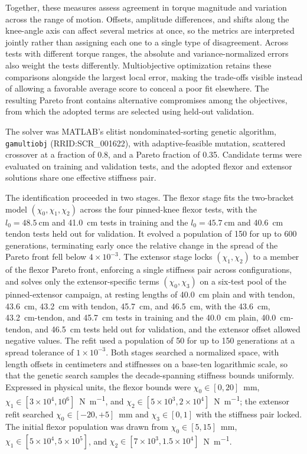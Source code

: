 \documentclass[utf8]{FrontiersinHarvard} %
\begin{document}
Together, these measures assess agreement in torque magnitude and variation across the range of motion. Offsets, amplitude differences, and shifts along the knee-angle axis can affect several metrics at once, so the metrics are interpreted jointly rather than assigning each one to a single type of disagreement. Across tests with different torque ranges, the absolute and variance-normalized errors also weight the tests differently. Multiobjective optimization retains these comparisons alongside the largest local error, making the trade-offs visible instead of allowing a favorable average score to conceal a poor fit elsewhere. The resulting Pareto front contains alternative compromises among the objectives, from which the adopted terms are selected using held-out validation.

The solver was MATLAB's elitist nondominated-sorting genetic algorithm, \texttt{gamultiobj} (RRID:SCR\_001622), with adaptive-feasible mutation, scattered crossover at a fraction of 0.8, and a Pareto fraction of 0.35. Candidate terms were evaluated on training and validation tests, and the adopted flexor and extensor solutions share one effective stiffness pair.

The identification proceeded in two stages. The flexor stage fits the two-bracket model $(\chi_{0}, \chi_{1}, \chi_{2})$ across the four pinned-knee flexor tests, with the $l_{0}=\qty{48.5}{\cm}$ and \qty{41.0}{\cm} tests in training and the $l_{0}=\qty{45.7}{\cm}$ and \qty{40.6}{\cm} tendon tests held out for validation. It evolved a population of 150 for up to 600 generations, terminating early once the relative change in the spread of the Pareto front fell below $4\times10^{-3}$. The extensor stage locks $(\chi_{1}, \chi_{2})$ to a member of the flexor Pareto front, enforcing a single stiffness pair across configurations, and solves only the extensor-specific terms $(\chi_{0}, \chi_{3})$ on a six-test pool of the pinned-extensor campaign, at resting lengths of \qty{40.0}{\cm} plain and with tendon, \qty{43.6}{\cm}, \qty{43.2}{\cm} with tendon, \qty{45.7}{\cm}, and \qty{46.5}{\cm}, with the \qty{43.6}{\cm}, \qty{43.2}{\cm}-tendon, and \qty{45.7}{\cm} tests in training and the \qty{40.0}{\cm} plain, \qty{40.0}{\cm}-tendon, and \qty{46.5}{\cm} tests held out for validation, and the extensor offset allowed negative values. The refit used a population of 50 for up to 150 generations at a spread tolerance of $1\times10^{-3}$. Both stages searched a normalized space, with length offsets in centimeters and stiffnesses on a base-ten logarithmic scale, so that the genetic search samples the decade-spanning stiffness bounds uniformly. Expressed in physical units, the flexor bounds were $\chi_{0} \in [0, 20]$~\si{\milli\metre}, $\chi_{1} \in [3\times10^{4}, 10^{6}]$~\si{\N\per\metre}, and $\chi_{2} \in [5\times10^{3}, 2\times10^{4}]$~\si{\N\per\metre}; the extensor refit searched $\chi_{0} \in [-20, +5]$~\si{\milli\metre} and $\chi_{3} \in [0, 1]$ with the stiffness pair locked. The initial flexor population was drawn from $\chi_{0} \in [5, 15]$~\si{\milli\metre}, $\chi_{1} \in [5\times10^{4}, 5\times10^{5}]$, and $\chi_{2} \in [7\times10^{3}, 1.5\times10^{4}]$~\si{\N\per\metre}.
\end{document}
